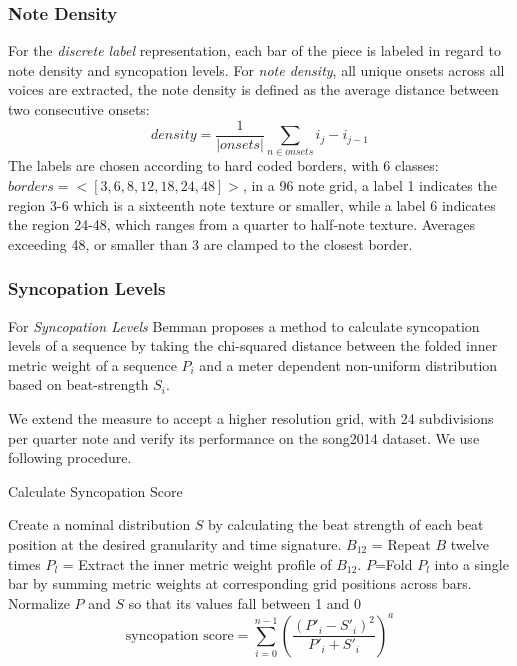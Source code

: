 \subsubsection{Note Density} For the \textit{discrete label} representation, each bar of the piece is labeled in regard to note density and syncopation levels. For \textit{note density}, all unique onsets across all voices are extracted, the note density is defined as the average distance between two consecutive onsets:
$$
density = \frac{1}{|onsets|}\sum_{n \in onsets}i_j-i_{j-1}
$$
The labels are chosen according to hard coded borders, with 6 classes: $borders = <[3,6,8,12,18,24,48]>$, in a 96 note grid, a label 1 indicates the region 3-6 which is a sixteenth note texture or smaller, while a label 6 indicates the region 24-48, which ranges from a quarter to half-note texture. Averages exceeding 48, or smaller than 3 are clamped to the closest border. \\
\subsubsection{Syncopation Levels}
For \textit{Syncopation Levels} Bemman \cite{Bemman2024} proposes a method to calculate syncopation levels of a sequence by taking the chi-squared distance  between the folded inner metric weight of a sequence  $P_i$ and a meter dependent non-uniform distribution based on beat-strength $S_i$. 
 
We extend the measure to accept a higher resolution grid, with 24 subdivisions per quarter note and verify its performance on the song2014 dataset.  We use following procedure.

\begin{algorithm}\label{algorithm:innermetricweight}
\caption{Calculate Syncopation Score}
\begin{algorithmic}[1]
\State Create a nominal distribution $S$ by calculating the beat strength of each beat position at the desired granularity and time signature.\cite{conf/ismir/CuthbertA10}
\State $B_{12}$ = Repeat $B$ twelve times
\State $P_l$ = Extract the inner metric weight profile of $B_{12}$.
\State $P$=Fold $P_l$ into a single bar by summing metric weights at corresponding grid positions across bars.
\State Normalize $P$ and $S$ so that its values fall between 1 and 0
\State 
\[
\text{syncopation score} = 
\sum_{i=0}^{n-1} \left( \frac{(P'_i - S'_i)^2}{P'_i + S'_i} \right)^a
\]
\end{algorithmic}
\end{algorithm}

